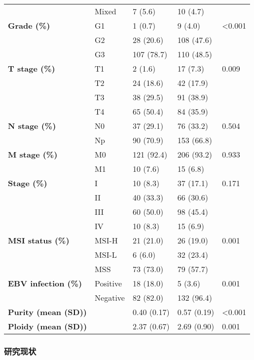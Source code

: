 \begin{table}[htbp]
\begin{tabular}{lllll}
            & Mixed & 7 (5.6) & 10 (4.7) &  \\
    \textbf{Grade (\%)} & G1    & 1 (0.7) & 9 (4.0) & <0.001 \\
            & G2    & 28 (20.6) & 108 (47.6) &  \\
            & G3    & 107 (78.7) & 110 (48.5) &  \\
    \textbf{T stage (\%)} & T1    & 2 (1.6) & 17 (7.3) & 0.009 \\
            & T2    & 24 (18.6) & 42 (17.9) &  \\
            & T3    & 38 (29.5) & 91 (38.9) &  \\
            & T4    & 65 (50.4) & 84 (35.9) &  \\
    \textbf{N stage (\%)} & N0    & 37 (29.1) & 76 (33.2) & 0.504 \\
            & Np    & 90 (70.9) & 153 (66.8) &  \\
    \textbf{M stage (\%)} & M0    & 121 (92.4) & 206 (93.2) & 0.933 \\
            & M1    & 10 (7.6) & 15 (6.8) &  \\
    \textbf{Stage (\%)} & I     & 10 (8.3) & 37 (17.1) & 0.171 \\
            & II    & 40 (33.3) & 66 (30.6) &  \\
            & III   & 60 (50.0) & 98 (45.4) &  \\
            & IV    & 10 (8.3) & 15 (6.9) &  \\
    \textbf{MSI status (\%)} & MSI-H & 21 (21.0) & 26 (19.0) & 0.001 \\
            & MSI-L & 6 (6.0) & 32 (23.4) &  \\
            & MSS   & 73 (73.0) & 79 (57.7) &  \\
    \textbf{EBV infection (\%)} & Positive & 18 (18.0) & 5 (3.6) & 0.001 \\
            & Negative & 82 (82.0) & 132 (96.4) &  \\
    \textbf{Purity (mean (SD))} &       & 0.40 (0.17) & 0.57 (0.19) & <0.001 \\
    \textbf{Ploidy (mean (SD))} &       & 2.37 (0.67) & 2.69 (0.90) & 0.001 \\
    \bottomrule
    \end{tabular}%
    \label{table1}%
\end{table}%

\clearpage

\subsubsection{研究现状}

